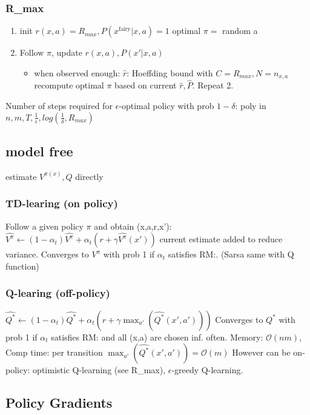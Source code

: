 \subsubsection{R_{max}}
\begin{enumerate}
    \item init $r(x,a) = R_{max}, P(x^{\text{fairy}}|x,a)=1$ \textrightarrow optimal $\pi=$ random a
    \item Follow $\pi$, update $r(x,a), P(x'|x,a)$
    \begin{itemize}
        \item when observed enough: $\hat{r}$: Hoeffding bound with $C=R_{max}, N=n_{x,a}$\\
        recompute optimal $\pi$ based on current $\hat{r}, \hat{P}$. Repeat 2.
    \end{itemize}
\end{enumerate}
Number of steps required for $\epsilon$-optimal policy with prob $1-\delta$:
poly in $n,m,T,\frac{1}{\epsilon}, log(\frac{1}{\delta}, R_{max})$


\subsection{model free}
estimate $V^{\pi(x)}, Q$ directly

\subsubsection{TD-learing (on policy)}
Follow a given policy $\pi$ and obtain (x,a,r,x'):
$\hat{V^\pi} \leftarrow (1-\alpha_{t})\hat{V^\pi} + \alpha_t (r + \gamma \hat{V^\pi}(x'))$
current estimate added to reduce variance.
Converges to $V^\pi$ with prob 1 if $\alpha_{t}$ satisfies \color{magenta}RM:\color{black}.
(Sarsa same with Q function)
\subsubsection{Q-learing (off-policy)}
$\hat{Q^*} \leftarrow (1-\alpha_{t})\hat{Q^*} + \alpha_t (r + \gamma \max_{a'}(\hat{Q^*}(x',a')))$
Converges to $Q^*$ with prob 1 if $\alpha_{t}$ satisfies \color{magenta}RM:\color{black} and
all (x,a) are chosen inf. often.
Memory: $\mathcal{O}(nm)$, Comp time: per transition $\max_{a'}(\hat{Q^*}(x',a')) = \mathcal{O}(m)$
However can be on-policy:
optimistic Q-learning (see R_{max}), $\epsilon$-greedy Q-learning.


\subsection{Policy Gradients}
